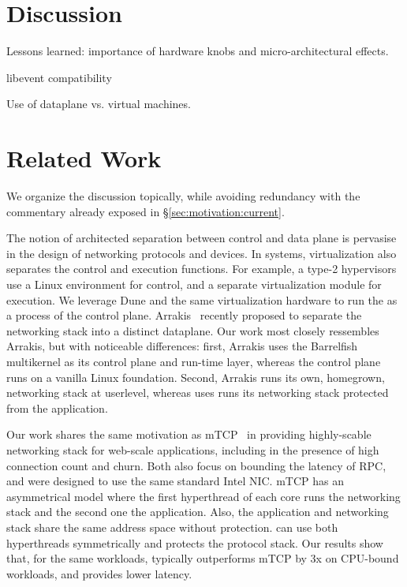 

\section{Discussion}

\todo Lessons learned: importance of hardware knobs and micro-architectural effects.

\todo libevent compatibility

\todo Use of dataplane vs. virtual machines. 

\section{Related Work}

We organize the discussion topically, while avoiding redundancy with
the commentary already exposed in \S\ref{sec:motivation:current}.


 The notion of
architected separation between control and data plane is pervasise in
the design of networking protocols and devices.  In systems,
virtualization also separates the control and execution functions. For
example, a type-2
hypervisors~\cite{DBLP:journals/tocs/BugnionDRSW12,misc/kivity07kvm}
use a Linux environment for control, and a separate virtualization
module for execution.  We leverage Dune and the same virtualization
hardware to run the \ix as a process of the control plane.
Arrakis~\cite{peter2013arrakis,arrakisTR13} recently proposed to
separate the networking stack into a distinct dataplane.  Our work
most closely ressembles Arrakis, but with noticeable differences:
first, Arrakis uses the Barrelfish multikernel as its control plane
and run-time layer, whereas the \ix control plane runs on a vanilla
Linux foundation.  Second, Arrakis runs its own, homegrown, networking
stack at userlevel, whereas \ix uses runs its networking stack
protected from the application.

 Our work shares the same
motivation as mTCP~\cite{jeong2014mtcp} in providing highly-scable
networking stack for web-scale applications, including in the presence
of high connection count and churn.  Both also focus on bounding the
latency of RPC, and were designed to use the same standard Intel NIC.
mTCP has an asymmetrical model where the first hyperthread of each
core runs the networking stack and the second one the application.
Also, the application and networking stack share the same address
space without protection.  \ix can use both hyperthreads symmetrically
and protects the protocol stack.   Our results show
that, for the same workloads, \ix typically outperforms mTCP by 3x on
CPU-bound workloads, and provides lower latency.
 
